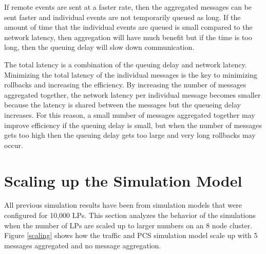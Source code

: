 \documentclass[11pt]{book}
\begin{document}
If remote events are sent at a faster rate, then the aggregated messages can be sent faster and
individual events are not temporarily queued as long.  If the amount of time that the individual
events are queued is small compared to the network latency, then aggregation will have
much benefit but if the time is too long, then the queuing delay will slow down communication.

The total latency is a combination of the queuing delay and network latency.  Minimizing the
total latency of the individual messages is the key to minimizing rollbacks and increasing the
efficiency.  By increasing the number of messages aggregated together, the network latency
per individual message becomes smaller because the latency is shared between the messages but
the queueing delay increases.  For this reason, a small number of messages aggregated together
may improve efficiency if the queuing delay is small, but when the number of messages gets too
high then the queuing delay gets too large and very long rollbacks may occur.

\section{Scaling up the Simulation Model}

All previous simulation results have been from simulation models that were configured for
10,000 LPs.  This section analyzes the behavior of the simulations when the number of LPs are
scaled up to larger numbers on an 8 node cluster.  Figure \ref{scaling} shows how the traffic
and PCS simulation model scale up with 5 messages aggregated and no message aggregation.
\end{document}
